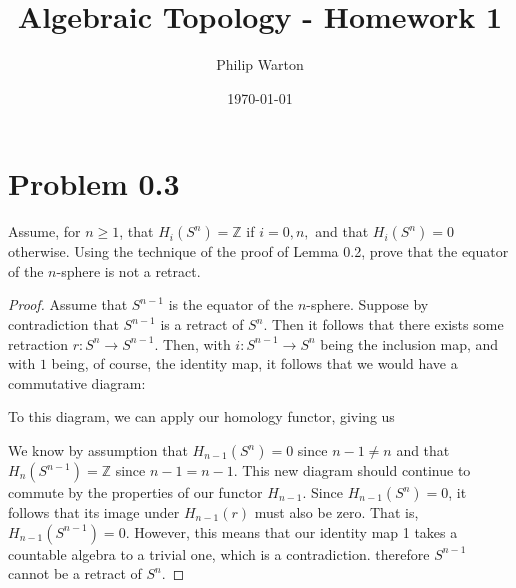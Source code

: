 \documentclass{article}
\theoremstyle{definition}
\begin{document}
\title{Algebraic Topology - Homework 1}
\author{Philip Warton}
\date{\today}
\maketitle
\section*{Problem 0.3}
    \begin{mdframed}[]
        Assume, for $n \geq 1$, that $H_i(S^n) = \mathbb{Z}$ if $i = 0, n,$ and that $H_i(S^n) = 0$ otherwise.
        Using the technique of the proof of Lemma 0.2, prove that the equator of the $n$-sphere is not a retract.
    \end{mdframed}
    \begin{proof}
        Assume that $S^{n-1}$ is the equator of the $n$-sphere. Suppose by contradiction that $S^{n-1}$ is a 
        retract of $S^n$. Then it follows that there exists some retraction $r:S^n \rightarrow S^{n-1}$.
        Then, with $i:S^{n-1} \rightarrow S^n$ being the inclusion map, and with $1$ being, of course, the 
        identity map, it follows that we would have a commutative diagram:
        \begin{center}
        \end{center}
        To this diagram, we can apply our homology functor, giving us
        \begin{center}
        \end{center}
        We know by assumption that $H_{n-1}(S^n) = 0$ since $n-1 \neq n$ and that $H_n(S^{n-1}) = \mathbb{Z}$ since
        $n - 1 = n - 1$. This new diagram should continue to commute by the properties of our functor $H_{n-1}$.
        Since $H_{n-1}(S^n) = 0$, it follows that its image under $H_{n-1}(r)$ must also be zero. That is, $H_{n-1}(S^{n-1}) =0$.
        However, this means that our identity map 1 takes a countable algebra to a trivial one, which is a contradiction.
        therefore $S^{n-1}$ cannot be a retract of $S^n$.
    \end{proof}
\end{document}
